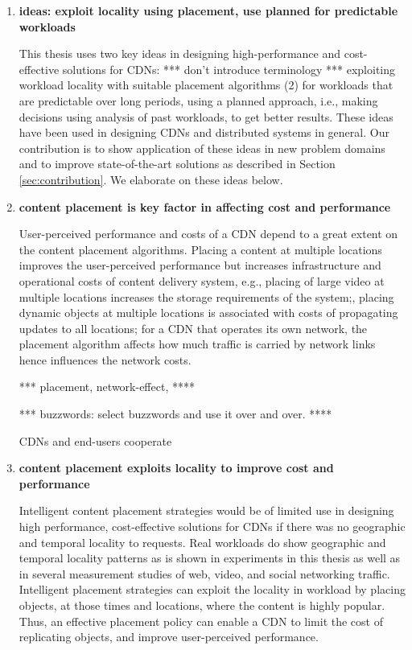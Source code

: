 \begin{enumerate}
\item
\textbf{ideas: exploit locality using placement, use planned for predictable workloads}

This thesis uses two key ideas in designing high-performance and cost-effective solutions for CDNs: *** don't introduce terminology *** exploiting workload locality with  suitable placement algorithms (2) for workloads that are predictable over long periods, using a planned approach, i.e., making decisions using analysis of past workloads, to get better results. These ideas have been used in designing CDNs and distributed systems in general. Our contribution is to show application of these ideas in new problem domains and to improve state-of-the-art solutions as described in Section \ref{sec:contribution}. 
We elaborate on these ideas below.


\item
\textbf{content placement is key factor in affecting cost and performance}

User-perceived performance and costs of a CDN depend to a great extent on the content placement algorithms. Placing a content at multiple locations  improves the user-perceived performance but increases infrastructure and operational costs of content delivery system, e.g., placing of large video at multiple locations increases the storage requirements of the system;, placing dynamic objects at multiple locations is associated with costs of propagating updates to all locations; for a CDN that operates its own network, the placement algorithm affects how much traffic is carried by network links hence influences the network costs. 

*** placement, network-effect, ****

*** buzzwords: select buzzwords and use it over and over. ****

CDNs and end-users cooperate 





\item
\textbf{content placement exploits locality to improve cost and performance}

Intelligent content placement strategies would be of limited use in designing high performance, cost-effective solutions for CDNs if  there was no geographic and temporal locality to requests.  Real workloads do show geographic and temporal locality patterns as is shown in experiments in this thesis as well as in several measurement studies of web, video, and social networking traffic. Intelligent placement strategies can exploit the locality in workload by placing objects, at those times and locations, where the content is highly popular. Thus, an effective placement policy can enable a CDN to limit the cost of replicating objects, and improve user-perceived performance. 




\end{enumerate}
